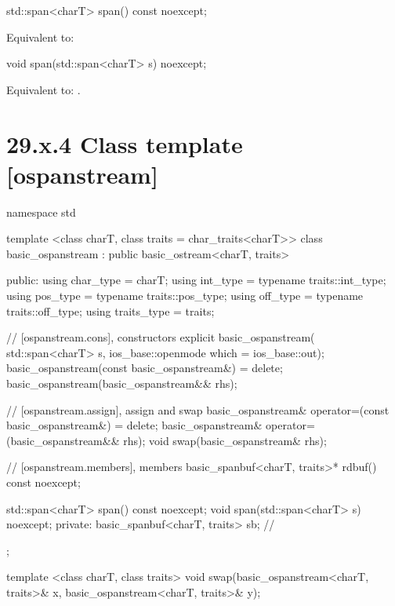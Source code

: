 \documentclass[ebook,11pt,article]{memoir}
\renewcommand{\iref}[1]{[#1]}
\begin{document}
\begin{itemdecl}
std::span<charT> span() const noexcept;
\end{itemdecl}

\begin{itemdescr}
\pnum
\effects Equivalent to:\\
\end{itemdescr}

\begin{itemdecl}
void span(std::span<charT> s) noexcept;
\end{itemdecl}

\begin{itemdescr}
\pnum
\effects
Equivalent to:
.
\end{itemdescr}

\section{29.x.4 Class template  [ospanstream] }

\begin{codeblock}
namespace std {
  template <class charT, class traits = char_traits<charT>>
  class basic_ospanstream
    : public basic_ostream<charT, traits> {
  public:
    using char_type      = charT;
    using int_type       = typename traits::int_type;
    using pos_type       = typename traits::pos_type;
    using off_type       = typename traits::off_type;
    using traits_type    = traits;

    // \iref{ospanstream.cons}, constructors
    explicit basic_ospanstream(
      std::span<charT> s,
      ios_base::openmode which = ios_base::out);
    basic_ospanstream(const basic_ospanstream&) = delete;
    basic_ospanstream(basic_ospanstream&& rhs);

    // \iref{ospanstream.assign}, assign and swap
    basic_ospanstream& operator=(const basic_ospanstream&) = delete;
    basic_ospanstream& operator=(basic_ospanstream&& rhs);
    void swap(basic_ospanstream& rhs);

    // \iref{ospanstream.members}, members
    basic_spanbuf<charT, traits>* rdbuf() const noexcept;

    std::span<charT> span() const noexcept;
    void span(std::span<charT> s) noexcept;
  private:
    basic_spanbuf<charT, traits> sb; // \expos
  };

  template <class charT, class traits>
    void swap(basic_ospanstream<charT, traits>& x,
              basic_ospanstream<charT, traits>& y);
}
\end{codeblock}
\end{document}
